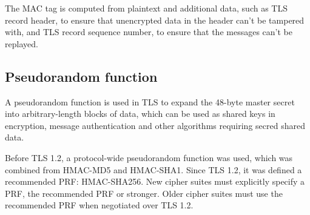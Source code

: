 The MAC tag is computed from plaintext and additional data, such as TLS record header, to ensure that unencrypted data in the header can't be tampered with, and TLS record sequence number, to ensure that the messages can't be replayed.

\subsection{Pseudorandom function}

A pseudorandom function is used in TLS to expand the 48-byte master secret into arbitrary-length blocks of data, which can be used as shared keys in encryption, message authentication and other algorithms requiring secred shared data.

Before TLS 1.2, a protocol-wide pseudorandom function was used, which was combined from HMAC-MD5 and HMAC-SHA1. Since TLS 1.2, it was defined a recommended PRF: HMAC-SHA256. New cipher suites must explicitly specify a PRF, the recommended PRF or stronger. Older cipher suites must use the recommended PRF when negotiated over TLS 1.2.
